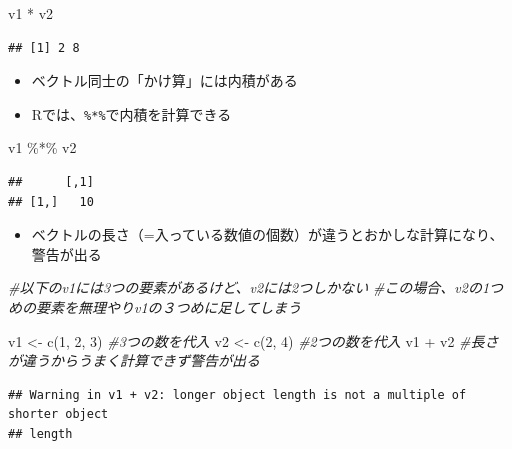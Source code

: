 \documentclass[
]{book}
\newenvironment{Shaded}{\begin{snugshade}}{\end{snugshade}}
\newcommand{\CommentTok}[1]{\textcolor[rgb]{0.56,0.35,0.01}{\textit{#1}}}
\newcommand{\DecValTok}[1]{\textcolor[rgb]{0.00,0.00,0.81}{#1}}
\newcommand{\FunctionTok}[1]{\textcolor[rgb]{0.00,0.00,0.00}{#1}}
\newcommand{\NormalTok}[1]{#1}
\newcommand{\OtherTok}[1]{\textcolor[rgb]{0.56,0.35,0.01}{#1}}
\newcommand{\SpecialCharTok}[1]{\textcolor[rgb]{0.00,0.00,0.00}{#1}}
\providecommand{\tightlist}{%
  \setlength{\itemsep}{0pt}\setlength{\parskip}{0pt}}
\begin{document}
\begin{Shaded}
\begin{Highlighting}[]
\NormalTok{v1 }\SpecialCharTok{*}\NormalTok{ v2}
\end{Highlighting}
\end{Shaded}

\begin{verbatim}
## [1] 2 8
\end{verbatim}

\begin{itemize}
\tightlist
\item
  ベクトル同士の「かけ算」には内積がある
\item
  Rでは、\texttt{\%*\%}で内積を計算できる
\end{itemize}

\begin{Shaded}
\begin{Highlighting}[]
\NormalTok{v1 }\SpecialCharTok{\%*\%}\NormalTok{ v2 }
\end{Highlighting}
\end{Shaded}

\begin{verbatim}
##      [,1]
## [1,]   10
\end{verbatim}

\begin{itemize}
\tightlist
\item
  ベクトルの長さ（=入っている数値の個数）が違うとおかしな計算になり、警告が出る
\end{itemize}

\begin{Shaded}
\begin{Highlighting}[]
\CommentTok{\#以下のv1には3つの要素があるけど、v2には2つしかない}
\CommentTok{\#この場合、v2の1つめの要素を無理やりv1の３つめに足してしまう}

\NormalTok{v1 }\OtherTok{\textless{}{-}} \FunctionTok{c}\NormalTok{(}\DecValTok{1}\NormalTok{, }\DecValTok{2}\NormalTok{, }\DecValTok{3}\NormalTok{)  }\CommentTok{\#3つの数を代入}
\NormalTok{v2 }\OtherTok{\textless{}{-}} \FunctionTok{c}\NormalTok{(}\DecValTok{2}\NormalTok{, }\DecValTok{4}\NormalTok{) }\CommentTok{\#2つの数を代入}
\NormalTok{v1 }\SpecialCharTok{+}\NormalTok{ v2 }\CommentTok{\#長さが違うからうまく計算できず警告が出る}
\end{Highlighting}
\end{Shaded}

\begin{verbatim}
## Warning in v1 + v2: longer object length is not a multiple of shorter object
## length
\end{verbatim}
\end{document}
